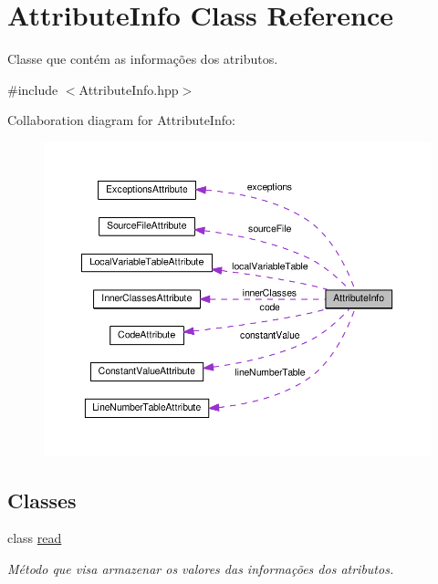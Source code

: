 \hypertarget{classAttributeInfo}{}\section{Attribute\+Info Class Reference}
\label{classAttributeInfo}


Classe que contém as informações dos atributos.  




{\ttfamily \#include $<$Attribute\+Info.\+hpp$>$}



Collaboration diagram for Attribute\+Info\+:\nopagebreak
\begin{figure}[H]
\begin{center}
\leavevmode
\includegraphics[width=350pt]{classAttributeInfo__coll__graph}
\end{center}
\end{figure}
\subsection*{Classes}
\begin{DoxyCompactItemize}
\item 
class \hyperlink{classAttributeInfo_1_1read}{read}
\begin{DoxyCompactList}\small\item\em Método que visa armazenar os valores das informações dos atributos. \end{DoxyCompactList}\end{DoxyCompactItemize}
